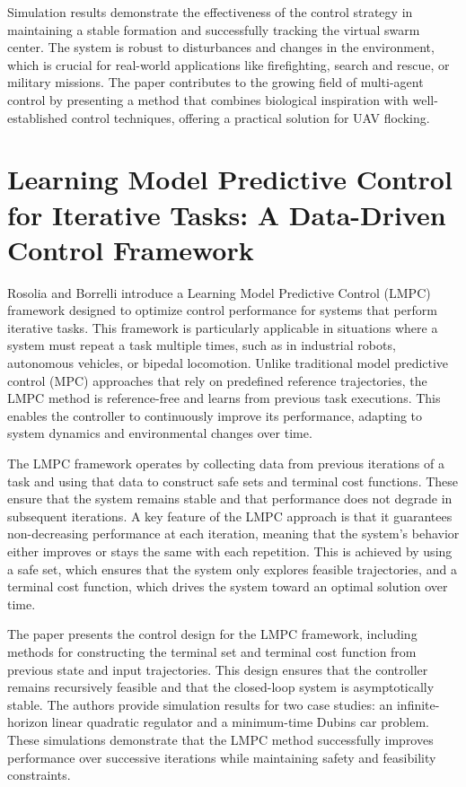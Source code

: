 \documentclass[a4paper,12pt]{article}
\begin{document}
Simulation results demonstrate the effectiveness of the control strategy in maintaining a stable formation and successfully tracking the virtual swarm center. The system is robust to disturbances and changes in the environment, which is crucial for real-world applications like firefighting, search and rescue, or military missions. The paper contributes to the growing field of multi-agent control by presenting a method that combines biological inspiration with well-established control techniques, offering a practical solution for UAV flocking.

\section{Learning Model Predictive Control for Iterative Tasks: A Data-Driven Control Framework \cite{rosolia2018learning}}
Rosolia and Borrelli introduce a Learning Model Predictive Control (LMPC) framework designed to optimize control performance for systems that perform iterative tasks. This framework is particularly applicable in situations where a system must repeat a task multiple times, such as in industrial robots, autonomous vehicles, or bipedal locomotion. Unlike traditional model predictive control (MPC) approaches that rely on predefined reference trajectories, the LMPC method is reference-free and learns from previous task executions. This enables the controller to continuously improve its performance, adapting to system dynamics and environmental changes over time.

The LMPC framework operates by collecting data from previous iterations of a task and using that data to construct safe sets and terminal cost functions. These ensure that the system remains stable and that performance does not degrade in subsequent iterations. A key feature of the LMPC approach is that it guarantees non-decreasing performance at each iteration, meaning that the system’s behavior either improves or stays the same with each repetition. This is achieved by using a safe set, which ensures that the system only explores feasible trajectories, and a terminal cost function, which drives the system toward an optimal solution over time.

The paper presents the control design for the LMPC framework, including methods for constructing the terminal set and terminal cost function from previous state and input trajectories. This design ensures that the controller remains recursively feasible and that the closed-loop system is asymptotically stable. The authors provide simulation results for two case studies: an infinite-horizon linear quadratic regulator and a minimum-time Dubins car problem. These simulations demonstrate that the LMPC method successfully improves performance over successive iterations while maintaining safety and feasibility constraints.
\end{document}
